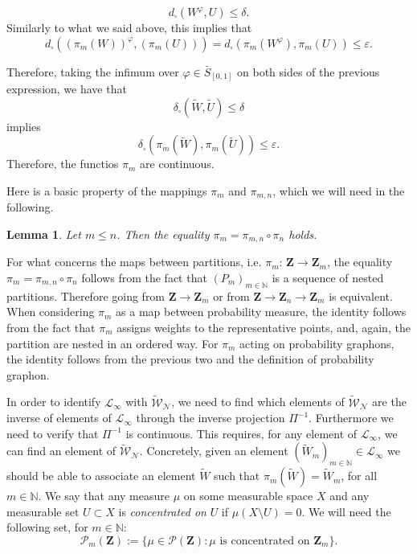 \documentclass[12pt,twoside,a4paper]{article}
\newtheorem{lemma}[theorem]{Lemma}
\def\N{\mathbb{N}}
\newcommand{\Space}{\mathbf{Z}}
\newcommand{\Relabel}{\bar{S}_{[0,1]}}
\begin{document}
\begin{equation*}
    d_{\square}(W^{\varphi},U)\leq \delta.
\end{equation*}
Similarly to what we said above, this implies that
\begin{equation*}
    d_{\square}((\pi_{m}(W))^{\varphi},(\pi_{m}(U)))=d_{\square}(\pi_{m}(W^{\varphi}),\pi_{m}(U))\leq  \varepsilon.
\end{equation*}

Therefore, taking the infimum over $\varphi\in \Relabel$ on both sides of the previous expression, we have that
\begin{equation*}
    \delta_{\square}(\widetilde{W},\widetilde{U})\leq \delta 
\end{equation*}
implies
\begin{equation*}
      \delta_{\square}(\pi_{m}(\widetilde{W}),\pi_{m}(\widetilde{U}))\leq  \varepsilon.
\end{equation*}
Therefore, the functios $\pi_{m}$ are continuous. 
\endproof



Here is a basic property of the mappings $\pi_m$ and $\pi_{m,n}$, which we will need in the following.

\begin{lemma}\label{lemm:compatProjPi}
    Let $m \leq n$. Then the equality $\pi_m = \pi_{m,n} \circ \pi_n$ holds.
\end{lemma}

\proof For what concerns the maps between partitions, i.e.  $\pi_m:\,\Space \to \Space_m$, the equality $\pi_m = \pi_{m,n} \circ \pi_n$ follows from the fact that $(P_m)_{m \in \mathbb{N}}$ is a sequence of nested partitions. Therefore going from $\Space \to \Space_m$ or from $\Space \to \Space_n\to \Space_m$ is equivalent. When considering $\pi_m$ as a map between probability measure, the identity follows from the fact that $\pi_m$ assigns weights to the representative points, and, again, the partition are nested in an ordered way. For $\pi_m$ acting on probability graphons, the identity follows from the previous two and the definition of probability graphon. 
\endproof

In order to identify $\mathcal{L}_\infty$ with $\widetilde{\mathcal{W}}_{\mathcal{N}}$, we need to find which elements of $\widetilde{\mathcal{W}}_{\mathcal{N}}$ are the inverse of elements of $\mathcal{L}_\infty$ through the inverse projection $\Pi^{-1}$. Furthermore we need to verify that $\Pi^{-1}$ is continuous. This requires, for any element of $\mathcal{L}_\infty$, we can find an element of $\widetilde{\mathcal{W}}_{\mathcal{N}}$. Concretely, given an element $(\widetilde{W}_m)_{m\in\N} \in \mathcal{L}_\infty$ we should be able to associate an element $\widetilde{W}$ such that $\pi_m(\widetilde{W})=\widetilde{W}_m$, for all $m\in\N$.  We say that any measure $\mu$ on some measurable space $X$ and any measurable set $U \subset X$  is \emph{concentrated on} $U$ if $\mu(X \setminus U) = 0$. We will need the following set, for $m \in \mathbb{N}$:
\begin{equation}
    \mathcal{P}_m(\Space) := \{ \mu \in \mathcal{P}(\Space) : \mu \text{ is concentrated on } \Space_m \}.
\end{equation}
\end{document}
